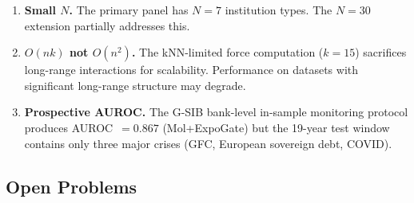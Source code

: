 \documentclass[final]{siamltex}
\begin{document}
\begin{enumerate}
\item \textbf{Small $N$.} The primary panel has $N=7$ institution
  types. The $N=30$ extension partially addresses this.

\item \textbf{$O(nk)$ not $O(n^2)$.} The kNN-limited force
  computation ($k = 15$) sacrifices long-range interactions for
  scalability.  Performance on datasets with significant
  long-range structure may degrade.

\item \textbf{Prospective AUROC.} The G-SIB bank-level in-sample
  monitoring protocol produces AUROC~$= 0.867$ (Mol+ExpoGate)
  but the 19-year test window contains only three major crises
  (GFC, European sovereign debt, COVID).
\end{enumerate}

\subsection{Open Problems}
\end{document}
